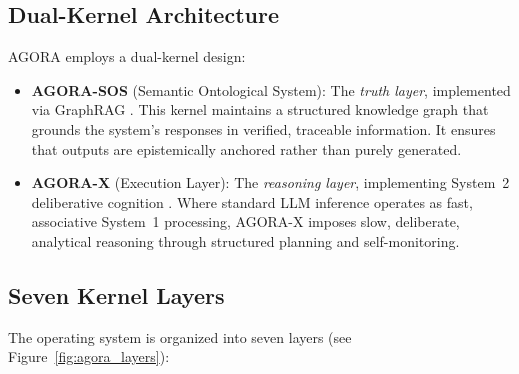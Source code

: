 \documentclass[11pt,a4paper]{article}
\begin{document}
\subsection{Dual-Kernel Architecture}

AGORA employs a dual-kernel design:

\begin{itemize}
    \item \textbf{AGORA-SOS} (Semantic Ontological System): The \emph{truth layer}, implemented via GraphRAG \citep{edge2024graphrag}. This kernel maintains a structured knowledge graph that grounds the system's responses in verified, traceable information. It ensures that outputs are epistemically anchored rather than purely generated.

    \item \textbf{AGORA-X} (Execution Layer): The \emph{reasoning layer}, implementing System~2 deliberative cognition \citep{kahneman2011thinking}. Where standard LLM inference operates as fast, associative System~1 processing, AGORA-X imposes slow, deliberate, analytical reasoning through structured planning and self-monitoring.
\end{itemize}

\subsection{Seven Kernel Layers}

The operating system is organized into seven layers (see Figure~\ref{fig:agora_layers}):
\end{document}
